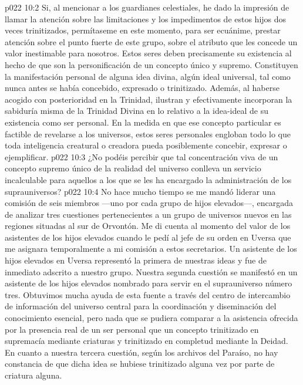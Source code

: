 \vs p022 10:2 \pc Si, al mencionar a los guardianes celestiales, he dado la impresión de llamar la atención sobre las limitaciones y los impedimentos de estos hijos dos veces trinitizados, permítaseme en este momento, para ser ecuánime, prestar atención sobre el punto fuerte de este grupo, sobre el atributo que les concede un valor inestimable para nosotros. Estos seres deben precisamente su existencia al hecho de que son la personificación de un concepto único y supremo. Constituyen la manifestación personal de alguna idea divina, algún ideal universal, tal como nunca antes se había concebido, expresado o trinitizado. Además, al haberse acogido con posterioridad en la Trinidad, ilustran y efectivamente incorporan la sabiduría misma de la Trinidad Divina en lo relativo a la idea\hyp{}ideal de su existencia como ser personal. En la medida en que ese concepto particular es factible de revelarse a los universos, estos seres personales engloban todo lo que toda inteligencia creatural o creadora pueda posiblemente concebir, expresar o ejemplificar. 
\vs p022 10:3 ¿No podéis percibir que tal concentración viva de un concepto supremo único de la realidad del universo conlleva un servicio incalculable para aquellos a los que se les ha encargado la administración de los suprauniversos?
\vs p022 10:4 \pc No hace mucho tiempo se me mandó liderar una comisión de seis miembros ---uno por cada grupo de hijos elevados---, encargada de analizar tres cuestiones pertenecientes a un grupo de universos nuevos en las regiones situadas al sur de Orvontón. Me di cuenta al momento del valor de los asistentes de los hijos elevados cuando le pedí al jefe de su orden en Uversa que me asignara temporalmente a mi comisión a estos secretarios. Un asistente de los hijos elevados en Uversa representó la primera de nuestras ideas y fue de inmediato adscrito a nuestro grupo. Nuestra segunda cuestión se manifestó en un asistente de los hijos elevados nombrado para servir en el suprauniverso número tres. Obtuvimos mucha ayuda de esta fuente a través del centro de intercambio de información del universo central para la coordinación y diseminación del conocimiento esencial, pero nada que se pudiera comparar a la asistencia ofrecida por la presencia real de un ser personal que  un concepto trinitizado en supremacía mediante criaturas y trinitizado en completud mediante la Deidad. En cuanto a nuestra tercera cuestión, según los archivos del Paraíso, no hay constancia de que dicha idea se hubiese trinitizado alguna vez por parte de criatura alguna.
